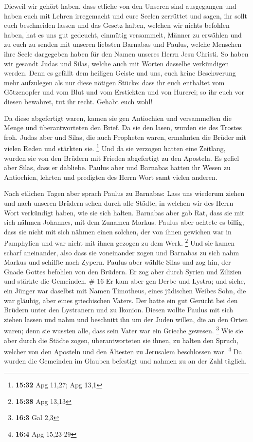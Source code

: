  Dieweil wir gehört haben, dass etliche von den Unseren
sind ausgegangen und haben euch mit Lehren irregemacht und eure Seelen
zerrüttet und sagen, ihr sollt euch beschneiden lassen und das Gesetz
halten, welchen wir nichts befohlen haben,  hat es uns gut
gedeucht, einmütig versammelt, Männer zu erwählen und zu euch zu senden
mit unseren liebsten Barnabas und Paulus,  welche Menschen
ihre Seele dargegeben haben für den Namen unseres Herrn Jesu Christi.
 So haben wir gesandt Judas und Silas, welche auch mit
Worten dasselbe verkündigen werden.  Denn es gefällt dem
heiligen Geiste und uns, euch keine Beschwerung mehr aufzulegen als nur
diese nötigen Stücke:  dass ihr euch enthaltet vom
Götzenopfer und vom Blut und vom Erstickten und von Hurerei; so ihr euch
vor diesen bewahret, tut ihr recht. Gehabt euch wohl!

 Da diese abgefertigt waren, kamen sie gen Antiochien und
versammelten die Menge und überantworteten den Brief.  Da
sie den lasen, wurden sie des Trostes froh.  Judas aber und
Silas, die auch Propheten waren, ermahnten die Brüder mit vielen Reden
und stärkten sie. \footnote{\textbf{15:32} Apg 11,27; Apg 13,1}
 Und da sie verzogen hatten eine Zeitlang, wurden sie von
den Brüdern mit Frieden abgefertigt zu den Aposteln.  Es
gefiel aber Silas, dass er dabliebe.  Paulus aber und
Barnabas hatten ihr Wesen zu Antiochien, lehrten und predigten des Herrn
Wort samt vielen anderen.

 Nach etlichen Tagen aber sprach Paulus zu Barnabas: Lass
uns wiederum ziehen und nach unseren Brüdern sehen durch alle Städte, in
welchen wir des Herrn Wort verkündigt haben, wie sie sich halten.
 Barnabas aber gab Rat, dass sie mit sich nähmen Johannes,
mit dem Zunamen Markus.  Paulus aber achtete es billig,
dass sie nicht mit sich nähmen einen solchen, der von ihnen gewichen war
in Pamphylien und war nicht mit ihnen gezogen zu dem Werk. \footnote{\textbf{15:38}
  Apg 13,13}  Und sie kamen scharf aneinander, also dass
sie voneinander zogen und Barnabas zu sich nahm Markus und schiffte nach
Zypern.  Paulus aber wählte Silas und zog hin, der Gnade
Gottes befohlen von den Brüdern.  Er zog aber durch Syrien
und Zilizien und stärkte die Gemeinden. \# 16  Er kam aber
gen Derbe und Lystra; und siehe, ein Jünger war daselbst mit Namen
Timotheus, eines jüdischen Weibes Sohn, die war gläubig, aber eines
griechischen Vaters.  Der hatte ein gut Gerücht bei den
Brüdern unter den Lystranern und zu Ikonion.  Diesen wollte
Paulus mit sich ziehen lassen und nahm und beschnitt ihn um der Juden
willen, die an den Orten waren; denn sie wussten alle, dass sein Vater
war ein Grieche gewesen. \footnote{\textbf{16:3} Gal 2,3} 
Wie sie aber durch die Städte zogen, überantworteten sie ihnen, zu
halten den Spruch, welcher von den Aposteln und den Ältesten zu
Jerusalem beschlossen war. \footnote{\textbf{16:4} Apg 15,23-29}
 Da wurden die Gemeinden im Glauben befestigt und nahmen zu
an der Zahl täglich.


